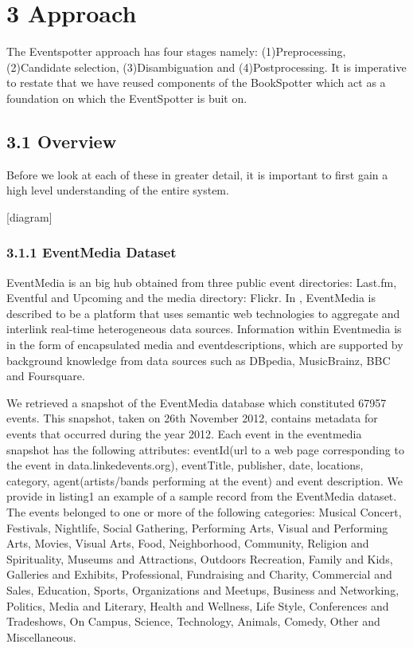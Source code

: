 \documentclass[a4paper,11pt]{report}
\begin{document}


\chapter*{3 Approach}
The Eventspotter approach has four stages namely: (1)Preprocessing, (2)Candidate selection, (3)Disambiguation and (4)Postprocessing. It is imperative to restate that we have reused components of the BookSpotter which act as a foundation on which the EventSpotter is buit on.

\section*{3.1 Overview}
Before we look at each of these in greater detail, it is important to first gain a high level understanding of the entire system.

[diagram]



\subsection*{3.1.1 EventMedia Dataset}
EventMedia is an big hub obtained from three public event directories: Last.fm, Eventful and Upcoming and the media directory: Flickr. In \cite{EURECOM+3865}, EventMedia is described to be a platform that uses semantic web technologies to aggregate and interlink real-time heterogeneous data sources. Information within Eventmedia is in the form of encapsulated media and eventdescriptions, which are supported by background knowledge from data sources such as DBpedia, MusicBrainz, BBC and Foursquare. 

We retrieved a snapshot of the EventMedia database which constituted 67957 events. This snapshot, taken on 26th November 2012, contains metadata for events that occurred during the year 2012. Each event in the eventmedia snapshot has the following attributes: eventId(url to a web page corresponding to the event in data.linkedevents.org), eventTitle, publisher, date, locations, category, agent(artists/bands performing at the event) and event description. We provide in listing1 an example of a sample record from the EventMedia dataset. The events belonged to one or more of the following categories: Musical Concert, Festivals, Nightlife, Social Gathering, Performing Arts, Visual and Performing Arts, Movies, Visual Arts, Food, Neighborhood, Community, Religion and Spirituality, Museums and Attractions, Outdoors Recreation, Family and Kids, Galleries and Exhibits, Professional, Fundraising and Charity, Commercial and Sales, Education, Sports, Organizations and Meetups, Business and Networking, Politics, Media and Literary, Health and Wellness, Life Style, Conferences and Tradeshows, On Campus, Science, Technology, Animals, Comedy, Other and Miscellaneous. 
\end{document}
